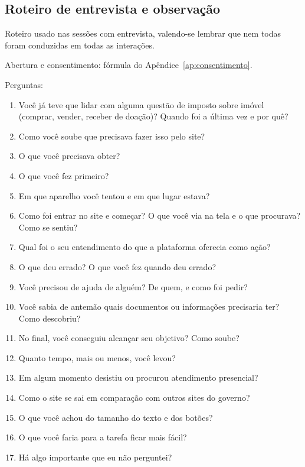 \documentclass[
  12pt,
  oneside,
  a4paper,
  chapter=TITLE,
  section=TITLE,
  english,
  brazilian
]{abntex2}
\begin{document}
\postextual



\begin{apendicesenv}
\partapendices

\chapter{Roteiro de entrevista e observação}\label{ap:roteiro}

Roteiro usado nas sessões com entrevista, valendo-se lembrar que nem todas foram conduzidas em todas as interações.

Abertura e consentimento: fórmula do Apêndice~\ref{ap:consentimento}.

Perguntas:
\begin{enumerate}
  \item Você já teve que lidar com alguma questão de imposto sobre imóvel
    (comprar, vender, receber de doação)? Quando foi a última vez e por quê?
  \item Como você soube que precisava fazer isso pelo site?
  \item O que você precisava obter?
  \item O que você fez primeiro?
  \item Em que aparelho você tentou e em que lugar estava?
  \item Como foi entrar no site e começar? O que você via na tela e o que
    procurava? Como se sentiu?
  \item Qual foi o seu entendimento do que a plataforma oferecia como ação?
  \item O que deu errado? O que você fez quando deu errado?
  \item Você precisou de ajuda de alguém? De quem, e como foi pedir?
  \item Você sabia de antemão quais documentos ou informações precisaria ter?
    Como descobriu?
  \item No final, você conseguiu alcançar seu objetivo? Como soube?
  \item Quanto tempo, mais ou menos, você levou?
  \item Em algum momento desistiu ou procurou atendimento presencial?
  \item Como o site se sai em comparação com outros sites do governo?
  \item O que você achou do tamanho do texto e dos botões?
  \item O que você faria para a tarefa ficar mais fácil?
  \item Há algo importante que eu não perguntei?
\end{enumerate}


\end{apendicesenv}
\end{document}
